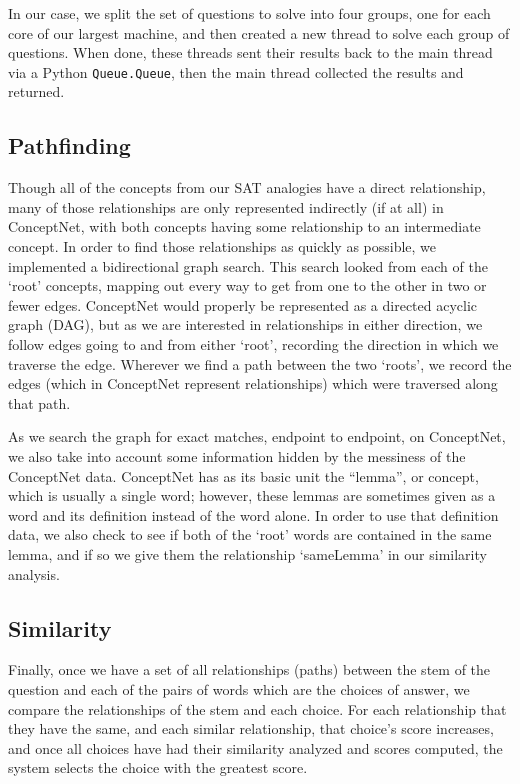 \documentclass[11pt]{article}
\begin{document}
In our case, we split the set of questions to solve into four groups, one for each core of our largest machine, and then created a new thread to solve each group of questions. When done, these threads sent their results back to the main thread via a Python \verb|Queue.Queue|, then the main thread collected the results and returned.

\subsection{Pathfinding}

Though all of the concepts from our SAT analogies have a direct relationship, many of those relationships are only represented indirectly (if at all) in ConceptNet, with both concepts having some relationship to an intermediate concept. In order to find those relationships as quickly as possible, we implemented a bidirectional graph search. This search looked from each of the `root' concepts, mapping out every way to get from one to the other in two or fewer edges. ConceptNet would properly be represented as a directed acyclic graph (DAG), but as we are interested in relationships in either direction, we follow edges going to and from either `root', recording the direction in which we traverse the edge. Wherever we find a path between the two `roots', we record the edges (which in ConceptNet represent relationships) which were traversed along that path.

As we search the graph for exact matches, endpoint to endpoint, on ConceptNet, we also take into account some information hidden by the messiness of the ConceptNet data. ConceptNet has as its basic unit the ``lemma'', or concept, which is usually a single word; however, these lemmas are sometimes given as a word and its definition instead of the word alone. In order to use that definition data, we also check to see if both of the `root' words are contained in the same lemma, and if so we give them the relationship `sameLemma' in our similarity analysis.

\subsection{Similarity}

Finally, once we have a set of all relationships (paths) between the stem of the question and each of the pairs of words which are the choices of answer, we compare the relationships of the stem and each choice. For each relationship that they have the same, and each similar relationship, that choice's score increases, and once all choices have had their similarity analyzed and scores computed, the system selects the choice with the greatest score.
\end{document}

